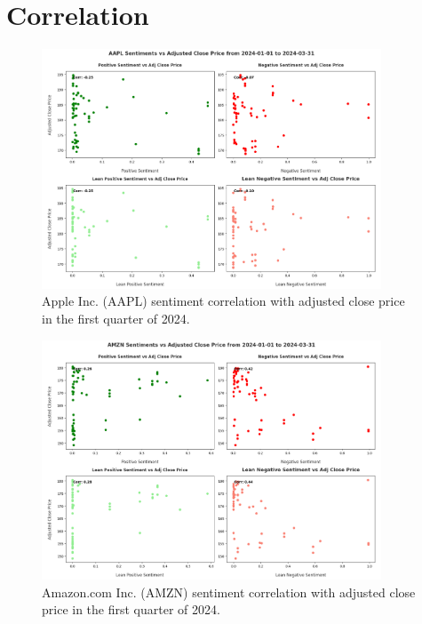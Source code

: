 \section{Correlation}
\label{appsec:correlation}

\begin{figure}[ht]
  \centering
  \includegraphics[width=0.9\textwidth]{img/experiment-stock/aapl-corr-a.pdf}
  \caption{Apple Inc. (AAPL) sentiment correlation with adjusted close price in the first quarter of 2024.}
  \label{fig:elsa-experiment-stock-aapl-corr}
\end{figure}

\begin{figure}[htbp]
  \centering
  \includegraphics[width=0.9\textwidth]{img/experiment-stock/amzn-corr-a.pdf}
  \caption{Amazon.com Inc. (AMZN) sentiment correlation with adjusted close price in the first quarter of 2024.}
  \label{fig:elsa-experiment-stock-amzn-corr}
\end{figure}

